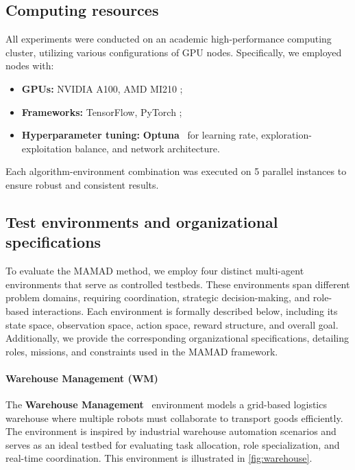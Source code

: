 \documentclass[pdflatex,sn-mathphys-num]{sn-jnl}%
\theoremstyle{thmstyleone}%
\theoremstyle{thmstyletwo}%
\theoremstyle{thmstylethree}%
\begin{document}
\subsection{Computing resources}

All experiments were conducted on an academic high-performance computing cluster, utilizing various configurations of GPU nodes. Specifically, we employed nodes with:
\begin{itemize}
    \item \textbf{GPUs:} NVIDIA A100, AMD MI210 ;
    \item \textbf{Frameworks:} TensorFlow, PyTorch ;
    \item \textbf{Hyperparameter tuning:} \textbf{Optuna}~\cite{akiba2019optuna} for learning rate, exploration-exploitation balance, and network architecture.
\end{itemize}

Each algorithm-environment combination was executed on 5 parallel instances to ensure robust and consistent results.

\subsection{Test environments and organizational specifications}

To evaluate the MAMAD method, we employ four distinct multi-agent environments that serve as controlled testbeds. These environments span different problem domains, requiring coordination, strategic decision-making, and role-based interactions. Each environment is formally described below, including its state space, observation space, action space, reward structure, and overall goal. Additionally, we provide the corresponding organizational specifications, detailing roles, missions, and constraints used in the MAMAD framework.

\paragraph{Warehouse Management (WM)}
The \textbf{Warehouse Management}~\cite{warehouse_management} environment models a grid-based logistics warehouse where multiple robots must collaborate to transport goods efficiently. The environment is inspired by industrial warehouse automation scenarios and serves as an ideal testbed for evaluating task allocation, role specialization, and real-time coordination. This environment is illustrated in \autoref{fig:warehouse}.
\end{document}
